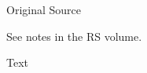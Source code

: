 			\begin{description}
				\item[Original Source]
			\end{description}
			
				See notes in the RS volume.
			
			
			\begin{description}
				\item[Text]
			\end{description}
			

